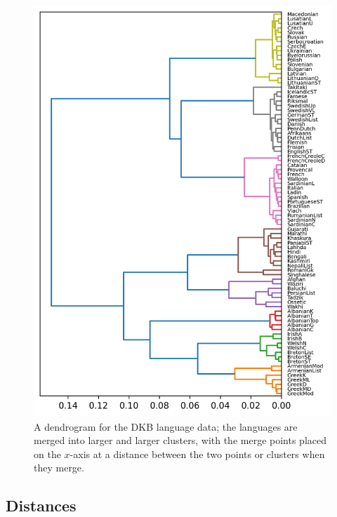 \documentclass[12pt]{article}
\begin{document}
\begin{figure}[hp]
\begin{center}  
  \includegraphics{dendrogram_big.png}
\end{center}
\caption{A dendrogram for the DKB language data; the languages are
  merged into larger and larger clusters, with the merge points placed
  on the $x$-axis at a distance between the two points or clusters when they merge.\label{fig:big_HAC}}
\end{figure}

\subsection*{Distances}
\end{document}
